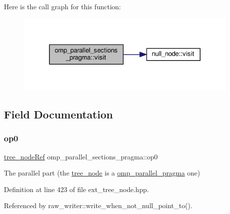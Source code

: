 Here is the call graph for this function\+:
\nopagebreak
\begin{figure}[H]
\begin{center}
\leavevmode
\includegraphics[width=311pt]{d7/d1c/structomp__parallel__sections__pragma_a8f7f1c69bd6c94e4fbe53daf45bb33a7_cgraph}
\end{center}
\end{figure}


\subsection{Field Documentation}
\mbox{\label{structomp__parallel__sections__pragma_a8c7f8623cb59b815575739e25041e16c}} 
\subsubsection{\texorpdfstring{op0}{op0}}
{\footnotesize\ttfamily \hyperlink{tree__node_8hpp_a6ee377554d1c4871ad66a337eaa67fd5}{tree\+\_\+node\+Ref} omp\+\_\+parallel\+\_\+sections\+\_\+pragma\+::op0}



The parallel part (the \hyperlink{classtree__node}{tree\+\_\+node} is a \hyperlink{structomp__parallel__pragma}{omp\+\_\+parallel\+\_\+pragma} one) 



Definition at line 423 of file ext\+\_\+tree\+\_\+node.\+hpp.



Referenced by raw\+\_\+writer\+::write\+\_\+when\+\_\+not\+\_\+null\+\_\+point\+\_\+to().

\mbox{\label{structomp__parallel__sections__pragma_a189c6528cc3490c79d0009549b7e8bfc}} 
